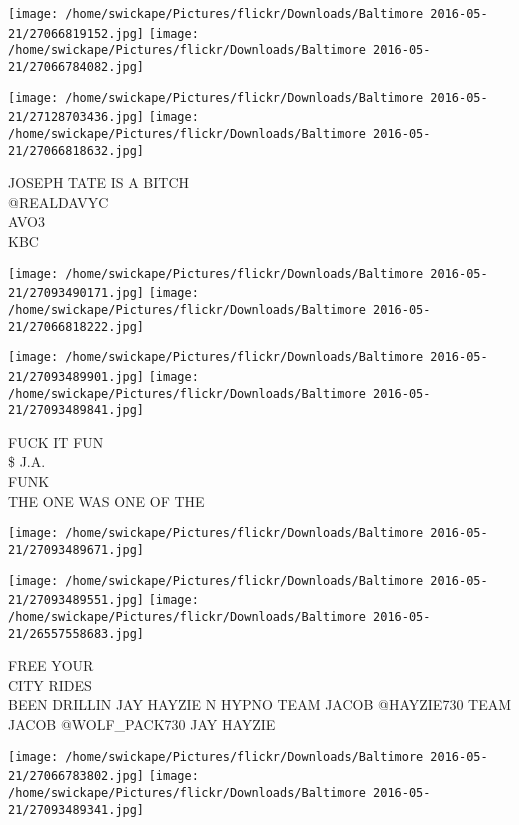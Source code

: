 \documentclass[10pt,letterpaper]{article}
\begin{document}
\texttt{[image: /home/swickape/Pictures/flickr/Downloads/Baltimore 2016-05-21/27066819152.jpg]}
\texttt{[image: /home/swickape/Pictures/flickr/Downloads/Baltimore 2016-05-21/27066784082.jpg]}

\texttt{[image: /home/swickape/Pictures/flickr/Downloads/Baltimore 2016-05-21/27128703436.jpg]}
\texttt{[image: /home/swickape/Pictures/flickr/Downloads/Baltimore 2016-05-21/27066818632.jpg]}

JOSEPH TATE IS A BITCH\\
@REALDAVYC\\
AVO3\\
KBC\\
\pagebreak

\texttt{[image: /home/swickape/Pictures/flickr/Downloads/Baltimore 2016-05-21/27093490171.jpg]}
\texttt{[image: /home/swickape/Pictures/flickr/Downloads/Baltimore 2016-05-21/27066818222.jpg]}

\texttt{[image: /home/swickape/Pictures/flickr/Downloads/Baltimore 2016-05-21/27093489901.jpg]}
\texttt{[image: /home/swickape/Pictures/flickr/Downloads/Baltimore 2016-05-21/27093489841.jpg]}

FUCK IT FUN\\
\$ J.A.\\
FUNK\\
THE ONE WAS ONE OF THE\\
\pagebreak

\texttt{[image: /home/swickape/Pictures/flickr/Downloads/Baltimore 2016-05-21/27093489671.jpg]}

\vspace{0.25in}
\texttt{[image: /home/swickape/Pictures/flickr/Downloads/Baltimore 2016-05-21/27093489551.jpg]}
\texttt{[image: /home/swickape/Pictures/flickr/Downloads/Baltimore 2016-05-21/26557558683.jpg]}

FREE YOUR\\
CITY RIDES\\
BEEN DRILLIN JAY HAYZIE N HYPNO TEAM JACOB @HAYZIE730 TEAM JACOB @WOLF\_PACK730 JAY HAYZIE\\
\pagebreak

\texttt{[image: /home/swickape/Pictures/flickr/Downloads/Baltimore 2016-05-21/27066783802.jpg]}
\texttt{[image: /home/swickape/Pictures/flickr/Downloads/Baltimore 2016-05-21/27093489341.jpg]}
\end{document}
